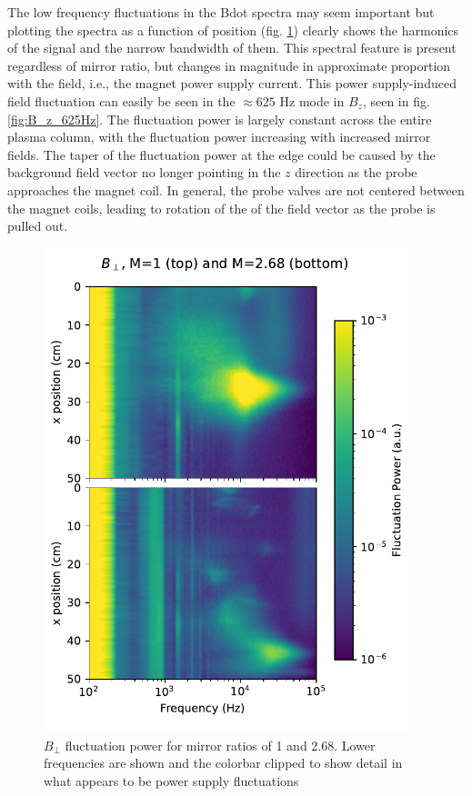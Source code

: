 The low frequency fluctuations in the Bdot spectra may seem important but plotting the spectra as a function of position (fig. \ref{fig_extra:Bperp_lowfreq_profile}) clearly shows the harmonics of the signal and the narrow bandwidth of them. This spectral feature is present regardless of mirror ratio, but changes in magnitude in approximate proportion with the field, i.e., the magnet power supply current. This power supply-induced field fluctuation can easily be seen in the $\approx 625$ Hz mode in $B_z$, seen in fig. \ref{fig:B_z_625Hz}. The fluctuation power is largely constant across the entire plasma column, with the fluctuation power increasing with increased mirror fields. The taper of the fluctuation power at the edge could be caused by the background field vector no longer pointing in the $z$ direction as the probe approaches the magnet coil. In general, the probe valves are not centered between the magnet coils, leading to rotation of the of the field vector as the probe is pulled out.

\begin{figure}
    \centering
    \includegraphics[width=300pt]{figures/extra/bperp_x-vs-f_lowfreq_M=1_and_2-68}
    \caption[$B_\perp$ fluctuation power profiles for low frequencies]{$B_\perp$ fluctuation power for mirror ratios of 1 and 2.68. Lower frequencies are shown and the colorbar clipped to show detail in what appears to be power supply fluctuations}
    \label{fig_extra:Bperp_lowfreq_profile}
\end{figure}

